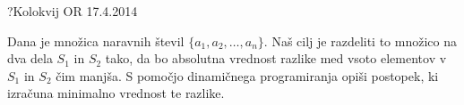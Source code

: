 \begin{naloga}{?}{Kolokvij OR 17.4.2014}
\begin{vprasanje}
Dana je množica naravnih števil $\{a_1, a_2, \dots, a_n\}$.
Naš cilj je razdeliti to množico na dva dela $S_1$ in $S_2$ tako,
da bo absolutna vrednost razlike
med vsoto elementov v $S_1$ in $S_2$ čim manjša.
S pomočjo dinamičnega programiranja opiši postopek,
ki izračuna minimalno vrednost te razlike.
\end{vprasanje}
\begin{odgovor}
\end{odgovor}
\end{naloga}
